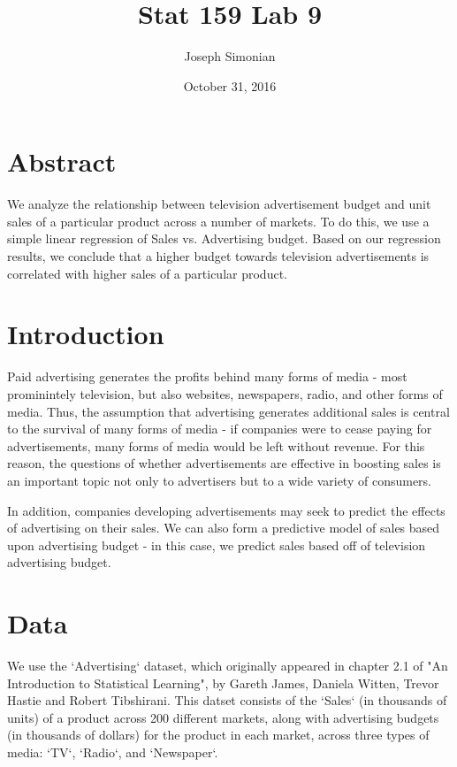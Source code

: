\documentclass{article}
\title{Stat 159 Lab 9}
\author{Joseph Simonian}
\date{October 31, 2016}
\begin{document}
\maketitle

\section{Abstract}

We analyze the relationship between television advertisement budget and unit sales of a particular product across a number of markets. To do this, we use a simple linear regression of Sales vs. Advertising budget. Based on our regression results, we conclude that a higher budget towards television advertisements is correlated with higher sales of a particular product.

\section{Introduction}

Paid advertising generates the profits behind many forms of media - most prominintely television, but also websites, newspapers, radio, and other forms of media. Thus, the assumption that advertising generates additional sales is central to the survival of many forms of media - if companies were to cease paying for advertisements, many forms of media would be left without revenue. For this reason, the questions of whether advertisements are effective in boosting sales is an important topic not only to advertisers but to a wide variety of consumers.

In addition, companies developing advertisements may seek to predict the effects of advertising on their sales. We can also form a predictive model of sales based upon advertising budget - in this case, we predict sales based off of television advertising budget.

\section{Data}

We use the `Advertising` dataset, which originally appeared in chapter 2.1 of "An Introduction to Statistical Learning", by Gareth James, Daniela Witten, Trevor Hastie and Robert Tibshirani. This datset consists of the `Sales` (in thousands of units) of a product across 200 different markets, along with advertising budgets (in thousands of dollars) for the product in each market, across three types of media: `TV`, `Radio`, and `Newspaper`.
\end{document}
